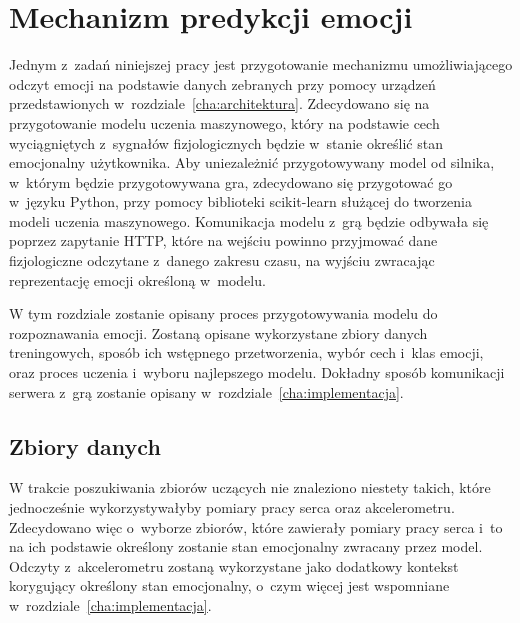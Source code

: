 \chapter{Mechanizm predykcji emocji}
\label{cha:predykcja}
Jednym z~zadań niniejszej pracy jest przygotowanie mechanizmu umożliwiającego odczyt emocji na podstawie danych zebranych przy pomocy urządzeń przedstawionych w~rozdziale~\ref{cha:architektura}. Zdecydowano się na przygotowanie modelu uczenia maszynowego, który na podstawie cech wyciągniętych z~sygnałów fizjologicznych będzie w~stanie określić stan emocjonalny użytkownika. Aby uniezależnić przygotowywany model od silnika, w~którym będzie przygotowywana gra, zdecydowano się przygotować go w~języku Python, przy pomocy biblioteki scikit-learn służącej do tworzenia modeli uczenia maszynowego. Komunikacja modelu z~grą będzie odbywała się poprzez zapytanie HTTP, które na wejściu powinno przyjmować dane fizjologiczne odczytane z~danego zakresu czasu, na wyjściu zwracając reprezentację emocji określoną w~modelu. 

W tym rozdziale zostanie opisany proces przygotowywania modelu do rozpoznawania emocji. Zostaną opisane wykorzystane zbiory danych treningowych, sposób ich wstępnego przetworzenia, wybór cech i~klas emocji, oraz proces uczenia i~wyboru najlepszego modelu. Dokładny sposób komunikacji serwera z~grą zostanie opisany w~rozdziale~\ref{cha:implementacja}.
\section{Zbiory danych}
W trakcie poszukiwania zbiorów uczących nie znaleziono niestety takich, które jednocześnie wykorzystywałyby pomiary pracy serca oraz akcelerometru. Zdecydowano więc o~wyborze zbiorów, które zawierały pomiary pracy serca i~to na ich podstawie określony zostanie stan emocjonalny zwracany przez model. Odczyty z~akcelerometru zostaną wykorzystane jako dodatkowy kontekst korygujący określony stan emocjonalny, o~czym więcej jest wspomniane w~rozdziale~\ref{cha:implementacja}.

